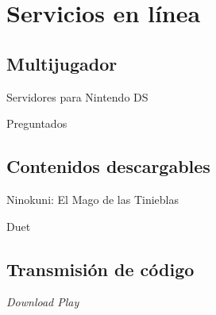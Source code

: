 
\section{Servicios en línea}
\subsection{Multijugador}
\begin{frame}{Servidores para Nintendo DS}

\end{frame}

\begin{frame}{Preguntados}

\end{frame}

\subsection{Contenidos descargables}
\begin{frame}{Ninokuni: El Mago de las Tinieblas}

\end{frame}

\begin{frame}{Duet}

\end{frame}

\subsection{Transmisión de código}
\begin{frame}{\textit{Download Play}}

\end{frame}
